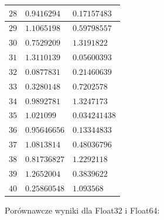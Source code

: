 \documentclass{article}
\begin{document}
\begin{center}
\begin{tabular}{|p{}|p{5cm}|p{5cm}|}
		\hline
		$28$ & $0.9416294$ & $0.17157483$ \\ 
		\hline
		$29$ & $1.1065198$ & $0.59798557$ \\ 
		\hline
		$30$ & $0.7529209$ & $1.3191822$ \\ 
		\hline
		$31$ & $1.3110139$ & $0.05600393$ \\ 
		\hline
		$32$ & $0.0877831$ & $0.21460639$ \\ 
		\hline
		$33$ & $0.3280148$ & $0.7202578$ \\ 
		\hline
		$34$ & $0.9892781$ & $1.3247173$ \\ 
		\hline
		$35$ & $1.021099$ & $0.034241438$ \\ 
		\hline
		$36$ & $0.95646656$ & $0.13344833$ \\ 
		\hline
		$37$ & $1.0813814$ & $0.48036796$ \\ 
		\hline
		$38$ & $0.81736827$ & $1.2292118$ \\ 
		\hline
		$39$ & $1.2652004$ & $0.3839622$ \\ 
		\hline
		$40$ & $0.25860548$ & $1.093568$ \\ 
		\hline
	\end{tabular}
\end{center}
\newpage
Porównawcze wyniki dla Float32 i Float64:
\end{document}
